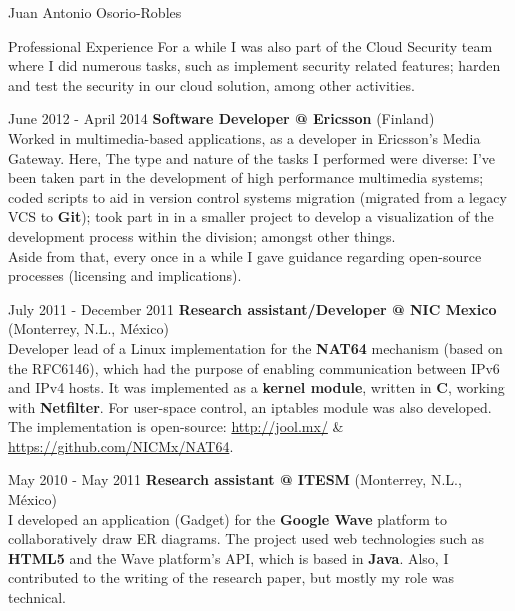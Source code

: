 \documentclass[english,10pt,letterpaper]{article}
\begin{document}
\begin{cv}{Juan Antonio Osorio-Robles}
\begin{cvlist}{Professional Experience}
            For a while I was also part of the Cloud Security team where
            I did numerous tasks, such as implement security related
            features; harden and test the security in our cloud solution,
            among other activities.

		\item [June 2012 - April 2014]
            \textbf{Software Developer @ Ericsson} (Finland)\\
            Worked in multimedia-based applications, as a developer in
            Ericsson's Media Gateway. Here, The type and nature of the
            tasks I performed were diverse: I've been taken part in the
            development of high performance multimedia systems; coded
            scripts to aid in version control systems migration (migrated
            from a legacy VCS to \textbf{Git}); took part in in a smaller
            project to develop a visualization of the development process
            within the division; amongst other things.\\

            Aside from that, every once in a while I gave guidance
            regarding open-source processes (licensing and implications).

		\item [July 2011 - December 2011]
            \textbf{Research assistant/Developer @ NIC Mexico} (Monterrey,
            N.L., M\'{e}xico)\\
            Developer lead of a Linux implementation for the \textbf{NAT64}
            mechanism (based on the RFC6146), which had the purpose of
            enabling communication between IPv6 and IPv4 hosts. It was
            implemented as a \textbf{kernel module}, written in \textbf{C},
            working with \textbf{Netfilter}. For user-space control, an
            iptables module was also developed. The implementation is
            open-source:
            \href{http://jool.mx/}{http://jool.mx/} \&\\
            \href{https://github.com/NICMx/NAT64}{https://github.com/NICMx/NAT64}.

		\item [May 2010 - May 2011]
            \textbf{Research assistant @ ITESM} (Monterrey, N.L., M\'{e}xico)\\
            I developed an application (Gadget) for the \textbf{Google Wave}
            platform to collaboratively draw ER diagrams. The project used web
            technologies such as \textbf{HTML5} and the Wave platform's API,
            which is based in \textbf{Java}. Also, I contributed to the
            writing of the research paper, but mostly my role was technical.


\end{cvlist}
\end{cv}
\end{document}
